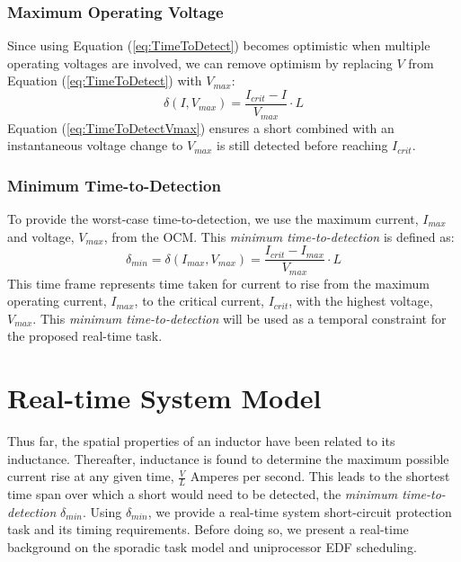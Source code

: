 \documentclass[11pt,oneside]{report}
\begin{document}
    \subsection{Maximum Operating Voltage}
    Since using Equation (\ref{eq:TimeToDetect}) becomes optimistic when multiple operating voltages are involved, we can remove optimism by replacing $V$ from Equation (\ref{eq:TimeToDetect}) with $V_{max}$:
    \begin{equation}\label{eq:TimeToDetectVmax}
    \delta(I,V_{max}) = \frac{I_{crit}-I}{V_{max}}\cdot L
    \end{equation}
    Equation (\ref{eq:TimeToDetectVmax}) ensures a short combined with an instantaneous voltage change to $V_{max}$ is still detected before reaching $I_{crit}$.
    
    \subsection{Minimum Time-to-Detection}
    To provide the worst-case time-to-detection, we use the maximum current, $I_{max}$ and voltage, $V_{max}$, from the OCM. This \textit{minimum time-to-detection} is defined as:
    \begin{equation}\label{eq:MinTimeToDetect}
    \delta_{min} = \delta(I_{max},V_{max}) = \frac{I_{crit}-I_{max}}{V_{max}}\cdot L
    \end{equation}
    This time frame represents time taken for current to rise from the maximum operating current, $I_{max}$, to the critical current, $I_{crit}$, with the highest voltage, $V_{max}$. This \textit{minimum time-to-detection} will be used as a temporal constraint for the proposed real-time task.
    \chapter{Real-time System Model}\label{chap:real-time system model}
    Thus far, the spatial properties of an inductor have been related to its inductance. Thereafter, inductance is found to determine the maximum possible current rise at any given time, $\frac{V}{L}$ Amperes per second. This leads to the shortest time span over which a short would need to be detected, the \textit{minimum time-to-detection} $\delta_{min}$. Using $\delta_{min}$, we provide a real-time system short-circuit protection task and its timing requirements. Before doing so, we present a real-time background on the sporadic task model and uniprocessor EDF scheduling.
    
\end{document}
